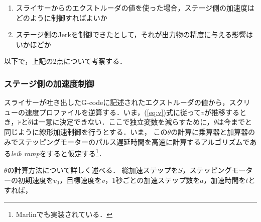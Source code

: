 \documentclass[twocolumn,oneside,a4paper]{article}
\begin{document}
\begin{enumerate}
     \item スライサーからのエクストルーダの値を使った場合，ステージ側の加速度はどのように制御すればよいか
     \item ステージ側のJerkを制御できたとして，それが出力物の精度に与える影響はいかほどか    
\end{enumerate}

以下で，上記の2点について考察する．

\subsubsection{ステージ側の加速度制御}
スライサーが吐き出したG-codeに記述されたエクストルーダの値から，スクリューの速度プロファイルを逆算する．いま，(\ref{eq:v})式に従って$v$が推移するとき，$\dot{r}$と$\dot{\theta}$は一意に決定できない．ここで独立変数を減らすために，$\theta$は今までと同じように線形加速制御を行うとする．いま， この$\theta$の計算に乗算器と加算器のみでステッピングモーターのパルス遅延時間を高速に計算するアルゴリズムである{\it leib ramp}\cite{leib}をすると仮定する\footnote{Marlinでも実装されている．}．

$\theta$の計算方法について詳しく述べる．
総加速ステップを$S$，ステッピングモーターの初期速度を$v_0$，目標速度を$v$，1秒ごとの加速ステップ数を$a$，加速時間を$t$とすれば，
\end{document}
